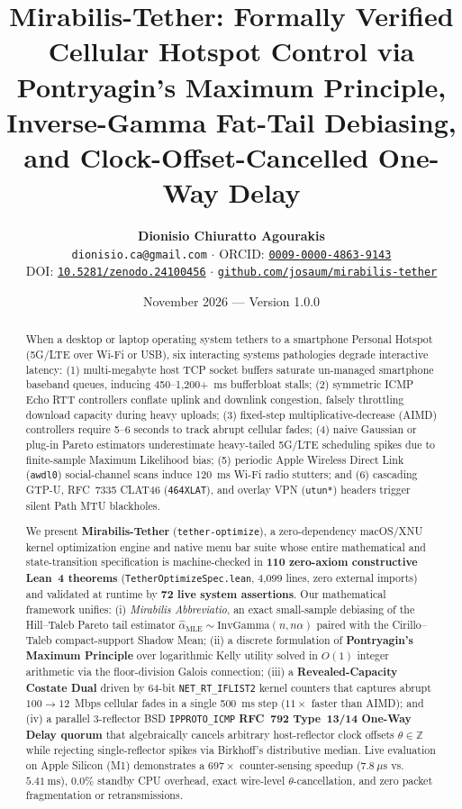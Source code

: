 \documentclass[11pt,a4paper]{article}
\title{\textbf{Mirabilis-Tether: Formally Verified Cellular Hotspot Control via Pontryagin's Maximum Principle, Inverse-Gamma Fat-Tail Debiasing, and Clock-Offset-Cancelled One-Way Delay}}
\author{\textbf{Dionisio Chiuratto Agourakis} \\
\texttt{dionisio.ca@gmail.com} $\cdot$ ORCID: \href{https://orcid.org/0009-0000-4863-9143}{\texttt{0009-0000-4863-9143}} \\
DOI: \href{https://doi.org/10.5281/zenodo.24100456}{\texttt{10.5281/zenodo.24100456}} $\cdot$ \href{https://github.com/josaum/mirabilis-tether}{\texttt{github.com/josaum/mirabilis-tether}}}
\date{November 2026 --- Version 1.0.0}
\theoremstyle{definition}
\begin{document}
\maketitle

\begin{abstract}
When a desktop or laptop operating system tethers to a smartphone Personal Hotspot (5G/LTE over Wi-Fi or USB), six interacting systems pathologies degrade interactive latency: (1) multi-megabyte host TCP socket buffers saturate un-managed smartphone baseband queues, inducing 450--1,200+~ms bufferbloat stalls; (2) symmetric ICMP Echo RTT controllers conflate uplink and downlink congestion, falsely throttling download capacity during heavy uploads; (3) fixed-step multiplicative-decrease (AIMD) controllers require 5--6 seconds to track abrupt cellular fades; (4) naive Gaussian or plug-in Pareto estimators underestimate heavy-tailed 5G/LTE scheduling spikes due to finite-sample Maximum Likelihood bias; (5) periodic Apple Wireless Direct Link (\texttt{awdl0}) social-channel scans induce 120~ms Wi-Fi radio stutters; and (6) cascading GTP-U, RFC~7335 CLAT46 (\texttt{464XLAT}), and overlay VPN (\texttt{utun*}) headers trigger silent Path MTU blackholes.

We present \textbf{Mirabilis-Tether} (\texttt{tether-optimize}), a zero-dependency macOS/XNU kernel optimization engine and native menu bar suite whose entire mathematical and state-transition specification is machine-checked in \textbf{110 zero-axiom constructive Lean~4 theorems} (\texttt{TetherOptimizeSpec.lean}, 4,099 lines, zero external imports) and validated at runtime by \textbf{72 live system assertions}. Our mathematical framework unifies: (i) \emph{Mirabilis Abbreviatio}, an exact small-sample debiasing of the Hill--Taleb Pareto tail estimator $\widehat{\alpha}_{\mathrm{MLE}} \sim \mathrm{InvGamma}(n, n\alpha)$ paired with the Cirillo--Taleb compact-support Shadow Mean; (ii) a discrete formulation of \textbf{Pontryagin's Maximum Principle} over logarithmic Kelly utility solved in $O(1)$ integer arithmetic via the floor-division Galois connection; (iii) a \textbf{Revealed-Capacity Costate Dual} driven by 64-bit \texttt{NET\_RT\_IFLIST2} kernel counters that captures abrupt $100 \to 12$~Mbps cellular fades in a single 500~ms step ($11\times$ faster than AIMD); and (iv) a parallel 3-reflector BSD \texttt{IPPROTO\_ICMP} \textbf{RFC~792 Type~13/14 One-Way Delay quorum} that algebraically cancels arbitrary host-reflector clock offsets $\theta \in \mathbb{Z}$ while rejecting single-reflector spikes via Birkhoff's distributive median. Live evaluation on Apple Silicon (M1) demonstrates a $697\times$ counter-sensing speedup ($7.8~\mu\text{s}$ vs.\ $5.41~\text{ms}$), $0.0\%$ standby CPU overhead, exact wire-level $\theta$-cancellation, and zero packet fragmentation or retransmissions.
\end{abstract}
\end{document}

